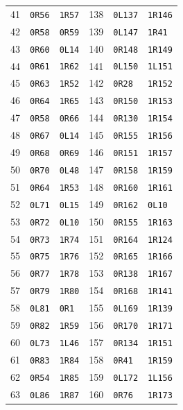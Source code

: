 \begin{longtable}{@{}rll@{\hspace{2em}}rll@{}}
41 & \texttt{0R56} & \texttt{1R57} & 138 & \texttt{0L137} & \texttt{1R146}\\
42 & \texttt{0R58} & \texttt{0R59} & 139 & \texttt{0L147} & \texttt{1R41}\\
43 & \texttt{0R60} & \texttt{0L14} & 140 & \texttt{0R148} & \texttt{1R149}\\
44 & \texttt{0R61} & \texttt{1R62} & 141 & \texttt{0L150} & \texttt{1L151}\\
45 & \texttt{0R63} & \texttt{1R52} & 142 & \texttt{0R28} & \texttt{1R152}\\
46 & \texttt{0R64} & \texttt{1R65} & 143 & \texttt{0R150} & \texttt{1R153}\\
47 & \texttt{0R58} & \texttt{0R66} & 144 & \texttt{0R130} & \texttt{1R154}\\
48 & \texttt{0R67} & \texttt{0L14} & 145 & \texttt{0R155} & \texttt{1R156}\\
49 & \texttt{0R68} & \texttt{0R69} & 146 & \texttt{0R151} & \texttt{1R157}\\
50 & \texttt{0R70} & \texttt{0L48} & 147 & \texttt{0R158} & \texttt{1R159}\\
51 & \texttt{0R64} & \texttt{1R53} & 148 & \texttt{0R160} & \texttt{1R161}\\
52 & \texttt{0L71} & \texttt{0L15} & 149 & \texttt{0R162} & \texttt{0L10}\\
53 & \texttt{0R72} & \texttt{0L10} & 150 & \texttt{0R155} & \texttt{1R163}\\
54 & \texttt{0R73} & \texttt{1R74} & 151 & \texttt{0R164} & \texttt{1R124}\\
55 & \texttt{0R75} & \texttt{1R76} & 152 & \texttt{0R165} & \texttt{1R166}\\
56 & \texttt{0R77} & \texttt{1R78} & 153 & \texttt{0R138} & \texttt{1R167}\\
57 & \texttt{0R79} & \texttt{1R80} & 154 & \texttt{0R168} & \texttt{1R141}\\
58 & \texttt{0L81} & \texttt{0R1} & 155 & \texttt{0L169} & \texttt{1R139}\\
59 & \texttt{0R82} & \texttt{1R59} & 156 & \texttt{0R170} & \texttt{1R171}\\
60 & \texttt{0L73} & \texttt{1L46} & 157 & \texttt{0R134} & \texttt{1R151}\\
61 & \texttt{0R83} & \texttt{1R84} & 158 & \texttt{0R41} & \texttt{1R159}\\
62 & \texttt{0R54} & \texttt{1R85} & 159 & \texttt{0L172} & \texttt{1L156}\\
63 & \texttt{0L86} & \texttt{1R87} & 160 & \texttt{0R76} & \texttt{1R173}\\

\end{longtable}
